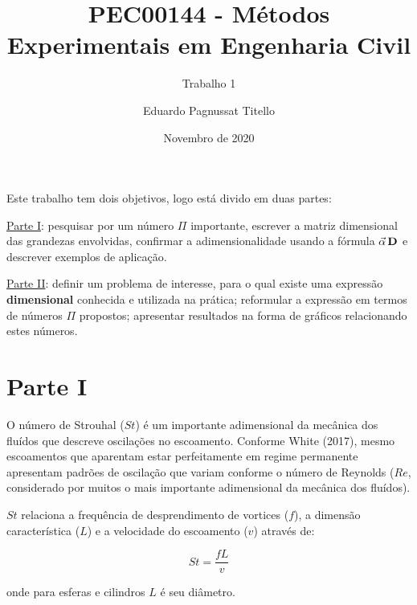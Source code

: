 

\author{Eduardo Pagnussat Titello}
\title{PEC00144 - Métodos Experimentais em Engenharia Civil}
\subtitle{Trabalho 1}
\date{Novembro de 2020}



    
\maketitle
    
    

Este trabalho tem dois objetivos, logo está divido em duas partes:

\hyperref[parte-i]{Parte I}: pesquisar por um número \(\Pi\) importante,
escrever a matriz dimensional das grandezas envolvidas, confirmar a
adimensionalidade usando a fórmula \(\vec{\alpha}\,{\bf D}\) e descrever
exemplos de aplicação.

\hyperref[parte-ii]{Parte II}: definir um problema de interesse, para o
qual existe uma expressão \textbf{dimensional} conhecida e utilizada na
prática; reformular a expressão em termos de números \(\Pi\) propostos;
apresentar resultados na forma de gráficos relacionando estes números.

    \hypertarget{parte-i}{%
\section{Parte I}\label{parte-i}}

O número de Strouhal (\(St\)) é um importante adimensional da mecânica
dos fluídos que descreve oscilações no escoamento. Conforme White
(2017), mesmo escoamentos que aparentam estar perfeitamente em regime
permanente apresentam padrões de oscilação que variam conforme o número
de Reynolds (\(Re\), considerado por muitos o mais importante
adimensional da mecânica dos fluídos).

\(St\) relaciona a frequência de desprendimento de vortices (\(f\)), a
dimensão característica (\(L\)) e a velocidade do escoamento (\(v\))
através de:

\begin{equation}
St=\frac{fL}{v}
\end{equation}

onde para esferas e cilindros \(L\) é seu diâmetro.

